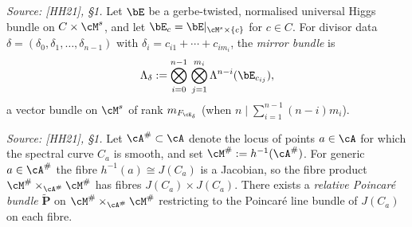 \begin{definition}
  \label{def:mirror_bundle_Lambda}
  \textit{Source: [HH21], §1.}
  Let \(\bE\) be a gerbe-twisted, normalised universal Higgs bundle on \(C \times \cM^s\), and
  let \(\bE_{c} = \bE|_{\cM^s \times \{c\}}\) for \(c \in C\).  For divisor data
  \(\delta = (\delta_0, \delta_1, \ldots, \delta_{n-1})\) with \(\delta_i = c_{i1} + \cdots + c_{im_i}\),
  the \emph{mirror bundle} is
  \[
    \Lambda_\delta
    := \bigotimes_{i=0}^{n-1}\, \bigotimes_{j=1}^{m_i} \Lambda^{n-i}(\bE_{c_{ij}}),
  \]
  a vector bundle on \(\cM^s\) of rank \(m_{F_{\cE_\delta}}\) (when \(n \mid \sum_{i=1}^{n-1}(n-i)m_i\)).
\end{definition}

\begin{definition}
  \label{def:relative_Poincare}
  \textit{Source: [HH21], §1.}
  Let \(\cA^{\#} \subset \cA\) denote the locus of points \(a \in \cA\) for which the spectral
  curve \(C_a\) is smooth, and set \(\cM^{\#} := h^{-1}(\cA^{\#})\).  For generic
  \(a \in \cA^{\#}\) the fibre \(h^{-1}(a) \cong J(C_a)\) is a Jacobian, so the fibre product
  \(\cM^{\#} \times_{\cA^{\#}} \cM^{\#}\) has fibres \(J(C_a) \times J(C_a)\).  There exists a
  \emph{relative Poincaré bundle} \(\widetilde{\mathbf{P}}\) on
  \(\cM^{\#} \times_{\cA^{\#}} \cM^{\#}\) restricting to the Poincaré line bundle of
  \(J(C_a)\) on each fibre.
\end{definition}

